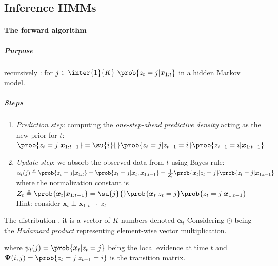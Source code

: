 \subsection{Inference HMMs}
\paragraph{The forward algorithm}
\subparagraph{Purpose} recursively : for $j\in\inter{1}{K}~
\prob{z_{t}=j|\bm{x}_{1:t}}$ in a hidden Markov model.
\subparagraph{Steps}
\begin{enumerate}
    \item \emph{Prediction step}: computing the \emph{one-step-ahead predictive 
        density} acting as the new prior for $t$:\\ $\prob{z_{t}=j|\bm{x}_{1:t-1}} =
        \su{i}{} \prob{z_{t}=j| z_{t-1}=i}\prob{z_{t-1}=i|\bm{x}_{1:t-1}}$
    \item \emph{Update step}: we absorb the observed data from $t$ using Bayes rule:\\
        $\alpha_{t}(j) \triangleq \prob{z_{t}=j| \bm{x}_{1:t}} = \prob{z_{
            t}=j| \bm{x}_{t}, \bm{x}_{1:t-1}} = \frac{1}{Z_{t}}\prob{\bm{x}_{
        t}|z_{t}=j} \prob{z_{t}=j|\bm{x}_{1:t-1}}$ 
        where  the normalization constant is $Z_{t} \triangleq \prob{\bm{x}_{t}|
        \bm{x}_{1:t-1}}=\su{j}{}\prob{\bm{x}_{t}|z_{t}=j}\prob{z_{t}=j|\bm{x}_{1:t-1}}$\\
        Hint: consider $\bm{x}_{t}\perp\bm{x}_{1:t-1}|z_{t}$
\end{enumerate}
The distribution ,
it is a vector of $K$ numbers denoted $\bm{\alpha}_{t}$
Considering $\odot$ being the \emph{Hadamard product} representing element-wise vector 
multiplication.
\begin{center}
\end{center}
where $\psi_{t}(j) = \prob{\bm{x}_{t}|z_{t}=j}$ being the local evidence at time $t$ and $\bm{\Psi}(
i,j)=\prob{z_{t}=j|z_{t-1}=i}$ is the transition matrix.

